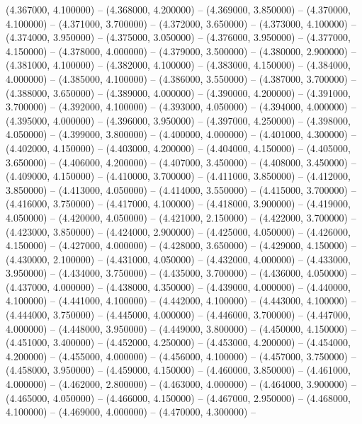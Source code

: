 (4.367000, 4.100000) -- 
(4.368000, 4.200000) -- 
(4.369000, 3.850000) -- 
(4.370000, 4.100000) -- 
(4.371000, 3.700000) -- 
(4.372000, 3.650000) -- 
(4.373000, 4.100000) -- 
(4.374000, 3.950000) -- 
(4.375000, 3.050000) -- 
(4.376000, 3.950000) -- 
(4.377000, 4.150000) -- 
(4.378000, 4.000000) -- 
(4.379000, 3.500000) -- 
(4.380000, 2.900000) -- 
(4.381000, 4.100000) -- 
(4.382000, 4.100000) -- 
(4.383000, 4.150000) -- 
(4.384000, 4.000000) -- 
(4.385000, 4.100000) -- 
(4.386000, 3.550000) -- 
(4.387000, 3.700000) -- 
(4.388000, 3.650000) -- 
(4.389000, 4.000000) -- 
(4.390000, 4.200000) -- 
(4.391000, 3.700000) -- 
(4.392000, 4.100000) -- 
(4.393000, 4.050000) -- 
(4.394000, 4.000000) -- 
(4.395000, 4.000000) -- 
(4.396000, 3.950000) -- 
(4.397000, 4.250000) -- 
(4.398000, 4.050000) -- 
(4.399000, 3.800000) -- 
(4.400000, 4.000000) -- 
(4.401000, 4.300000) -- 
(4.402000, 4.150000) -- 
(4.403000, 4.200000) -- 
(4.404000, 4.150000) -- 
(4.405000, 3.650000) -- 
(4.406000, 4.200000) -- 
(4.407000, 3.450000) -- 
(4.408000, 3.450000) -- 
(4.409000, 4.150000) -- 
(4.410000, 3.700000) -- 
(4.411000, 3.850000) -- 
(4.412000, 3.850000) -- 
(4.413000, 4.050000) -- 
(4.414000, 3.550000) -- 
(4.415000, 3.700000) -- 
(4.416000, 3.750000) -- 
(4.417000, 4.100000) -- 
(4.418000, 3.900000) -- 
(4.419000, 4.050000) -- 
(4.420000, 4.050000) -- 
(4.421000, 2.150000) -- 
(4.422000, 3.700000) -- 
(4.423000, 3.850000) -- 
(4.424000, 2.900000) -- 
(4.425000, 4.050000) -- 
(4.426000, 4.150000) -- 
(4.427000, 4.000000) -- 
(4.428000, 3.650000) -- 
(4.429000, 4.150000) -- 
(4.430000, 2.100000) -- 
(4.431000, 4.050000) -- 
(4.432000, 4.000000) -- 
(4.433000, 3.950000) -- 
(4.434000, 3.750000) -- 
(4.435000, 3.700000) -- 
(4.436000, 4.050000) -- 
(4.437000, 4.000000) -- 
(4.438000, 4.350000) -- 
(4.439000, 4.000000) -- 
(4.440000, 4.100000) -- 
(4.441000, 4.100000) -- 
(4.442000, 4.100000) -- 
(4.443000, 4.100000) -- 
(4.444000, 3.750000) -- 
(4.445000, 4.000000) -- 
(4.446000, 3.700000) -- 
(4.447000, 4.000000) -- 
(4.448000, 3.950000) -- 
(4.449000, 3.800000) -- 
(4.450000, 4.150000) -- 
(4.451000, 3.400000) -- 
(4.452000, 4.250000) -- 
(4.453000, 4.200000) -- 
(4.454000, 4.200000) -- 
(4.455000, 4.000000) -- 
(4.456000, 4.100000) -- 
(4.457000, 3.750000) -- 
(4.458000, 3.950000) -- 
(4.459000, 4.150000) -- 
(4.460000, 3.850000) -- 
(4.461000, 4.000000) -- 
(4.462000, 2.800000) -- 
(4.463000, 4.000000) -- 
(4.464000, 3.900000) -- 
(4.465000, 4.050000) -- 
(4.466000, 4.150000) -- 
(4.467000, 2.950000) -- 
(4.468000, 4.100000) -- 
(4.469000, 4.000000) -- 
(4.470000, 4.300000) -- 
